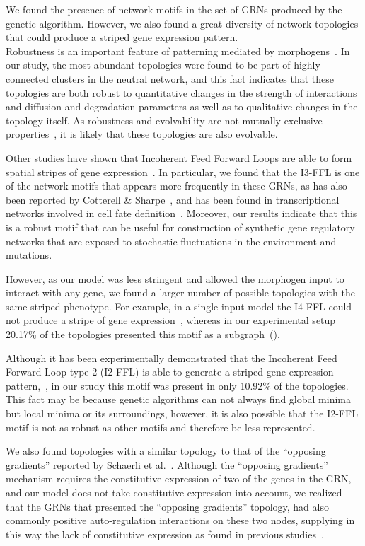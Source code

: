 \documentclass[10pt,letterpaper]{article}
\begin{document}
We found the presence of network motifs in the set of GRNs produced by the
genetic algorithm. However, we also found a great diversity of network
topologies that could produce a striped gene expression pattern.\\

Robustness is an important feature of patterning mediated by
morphogens~\cite{lo_robust_2015}. In our study, the most abundant topologies were
found to be part of highly connected clusters in the neutral network, and this fact
indicates that these topologies are both robust to quantitative changes in the
strength of interactions and diffusion and degradation parameters as well as to
qualitative changes in the topology itself. As robustness and evolvability are
not mutually exclusive properties~\cite{wagner_robustness_2008}, it is likely
that these topologies are also evolvable.

Other studies have shown that Incoherent Feed Forward Loops are able to form
spatial stripes of gene expression~\cite{ishihara_cross_2005}. In particular,
we found that the I3-FFL is one of the network motifs that appears more
frequently in these GRNs, as has also been reported by Cotterell \&
Sharpe~\cite{Cotterell2010}, and has been found in transcriptional networks involved
in cell fate definition~\cite{Li2019}. Moreover, our results indicate that this
is a robust motif that can be useful for construction of synthetic gene
regulatory networks that are exposed to stochastic fluctuations in the
environment and mutations.

However, as our model was less stringent and allowed the morphogen input to
interact with any gene, we found a larger number of possible topologies with the
same striped phenotype. For example, in a single input model the I4-FFL could
not produce a stripe of gene expression~\cite{munteanu_2014}, whereas in our
experimental setup 20.17\% of the topologies presented this motif as a
subgraph~().

Although it has been experimentally demonstrated that the Incoherent Feed
Forward Loop type 2 (I2-FFL) is able to generate a striped gene expression
pattern,~\cite{Schaerli2014, Basu2005}, in our study this motif was present in
only 10.92\% of the topologies. This fact may be because genetic algorithms
can not always find global minima but local minima or its surroundings, however,
it is also possible that the I2-FFL motif is not as robust as other motifs and
therefore be less represented.

We also found topologies with a similar topology to that of the “opposing
gradients” reported by Schaerli et al.~\cite{Schaerli2018,Schaerli2014}.
Although the “opposing gradients” mechanism requires the constitutive expression
of two of the genes in the GRN, and our model does not take constitutive
expression into account, we realized that the GRNs that presented the “opposing
gradients” topology, had also commonly positive auto-regulation interactions on
these two nodes, supplying in this way the lack of constitutive
expression as found in previous studies~\cite{munteanu_2014}.
\end{document}
